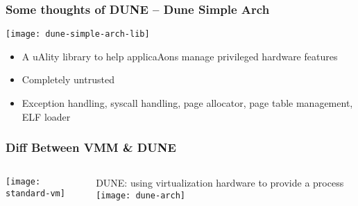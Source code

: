 \begin{frame}[plain]
	\frametitle{ Some thoughts of DUNE -- Dune Simple Arch}
	
	\centering
	
	
	\texttt{[image: dune-simple-arch-lib]}
	\centering
	\begin{itemize}
		\item A	
 uAlity	
 library	
 to	
 help	
 applicaAons	
 manage	
 privileged	
 hardware	
  		features		
  		
		
		\item Completely	 untrusted
		
		\item Exception	
 handling,	
 syscall	
 handling,	
 page	
 allocator,	
 page	
 table	
  		management,	
 ELF	
 loader	
 
	\end{itemize}		
	
\end{frame}
\begin{frame}[plain]
	\frametitle{Diff Between VMM \& DUNE}
	
	
	
	\begin{columns}
		
		\begin{column}{.5\textwidth}
			
			\texttt{[image: standard-vm]}
			
		\end{column}
		
		\begin{column}{.5\textwidth}
			\centering
			DUNE:  using virtualization hardware to provide a process
			\texttt{[image: dune-arch]}			
			
		\end{column}
		
		
	\end{columns}
	
	
\end{frame}


